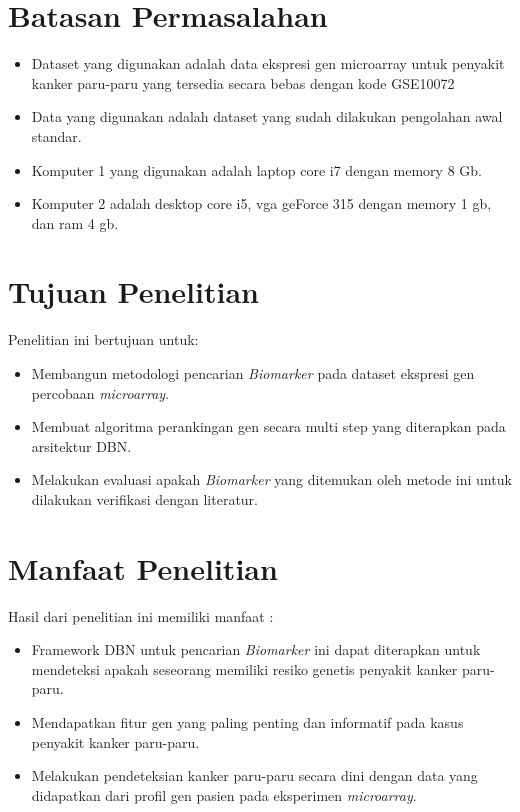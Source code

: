 \section{Batasan Permasalahan}

\begin{itemize}
\item Dataset yang digunakan adalah data ekspresi gen microarray untuk penyakit kanker paru-paru yang tersedia secara bebas dengan kode GSE10072
\item Data yang digunakan adalah dataset yang sudah dilakukan pengolahan awal standar.
\item Komputer 1 yang digunakan adalah laptop core i7 dengan memory 8 Gb.
\item Komputer 2 adalah desktop core i5, vga geForce 315 dengan memory 1 gb, dan ram 4 gb.
\end{itemize}

\section{Tujuan Penelitian}
Penelitian ini bertujuan untuk:
\begin{itemize}
\item Membangun metodologi pencarian \textit{Biomarker} pada dataset ekspresi gen percobaan \textit{microarray}.
\item Membuat algoritma perankingan gen secara multi step yang diterapkan pada arsitektur DBN.
\item Melakukan evaluasi apakah \textit{Biomarker} yang ditemukan oleh metode ini untuk dilakukan verifikasi dengan literatur.
\end{itemize}


\section{Manfaat Penelitian}
Hasil dari penelitian ini memiliki manfaat :
\begin{itemize}
\item Framework DBN untuk pencarian \textit{Biomarker} ini dapat diterapkan untuk mendeteksi apakah seseorang memiliki resiko genetis penyakit kanker paru-paru. 
\item Mendapatkan fitur gen yang paling penting dan informatif pada kasus penyakit kanker paru-paru.
\item Melakukan pendeteksian kanker paru-paru secara dini dengan data yang didapatkan dari profil gen pasien pada eksperimen  \textit{microarray}.
\end{itemize}


